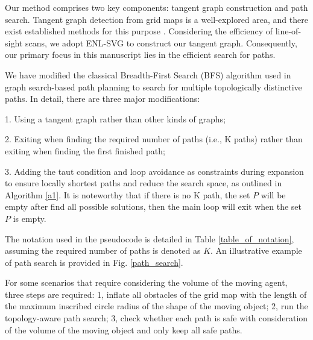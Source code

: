 \documentclass[letterpaper, 10 pt, journal, twoside]{IEEEtran}
\begin{document}
Our method comprises two key components: tangent graph construction and path search. Tangent graph detection from grid maps is a well-explored area, and there exist established methods for this purpose \cite{liu1991proposal, yao2019reinforcedrimjump, oh2017edge}. Considering the efficiency of line-of-sight scans, we adopt ENL-SVG\cite{oh2017edge} to construct our tangent graph. Consequently, our primary focus in this manuscript lies in the efficient search for paths.

We have modified the classical Breadth-First Search (BFS) algorithm used in graph search-based path planning to search for multiple topologically distinctive paths. In detail, there are three major modifications:

1. Using a tangent graph rather than other kinds of graphs;
 
2. Exiting when finding the required number of paths (i.e., K paths) rather than exiting when finding the first finished path;

3. Adding the taut condition\cite{oh2017edge} and loop avoidance as constraints during expansion to ensure locally shortest paths and reduce the search space, as outlined in Algorithm \ref{a1}. It is noteworthy that if there is no K path, the set $P$ will be empty after find all possible solutions, then the main loop will exit when the set $P$ is empty.

The notation used in the pseudocode is detailed in Table \ref{table_of_notation}, assuming the required number of paths is denoted as $K$. An illustrative example of path search is provided in Fig. \ref{path_search}. 

For some scenarios that require considering the volume of the moving agent, three steps are required:
1, inflate all obstacles of the grid map with the length of the maximum inscribed circle radius of the shape of the moving object;
2, run the topology-aware path search;
3, check whether each path is safe with consideration of the volume of the moving object and only keep all safe paths.
\end{document}
